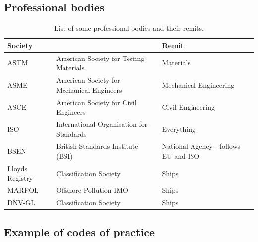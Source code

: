 \subsection{Professional bodies}
\begin{table}[H]
    \centering
    \begin{tabular}{@{}lll@{}}
        \toprule
        \textbf{Society} &                                           & \textbf{Remit}                       \\
        \midrule
        ASTM             & American Society for Testing Materials    & Materials                            \\
        ASME             & American Society for Mechanical Engineers & Mechanical Engineering               \\
        ASCE             & American Society for Civil Engineers      & Civil Engineering                    \\
        ISO              & International Organisation for Standards  & Everything                           \\
        BSEN             & British Standards Institute (BSI)         & National Agency - follows EU and ISO \\
        Lloyds Registry  & Classification Society                    & Ships                                \\
        MARPOL           & Offshore Pollution IMO                    & Ships                                \\
        DNV-GL           & Classification Society                    & Ships                                \\
        \bottomrule
    \end{tabular}
    \caption{List of some professional bodies and their remits.}
\end{table}
\subsection{Example of codes of practice}

